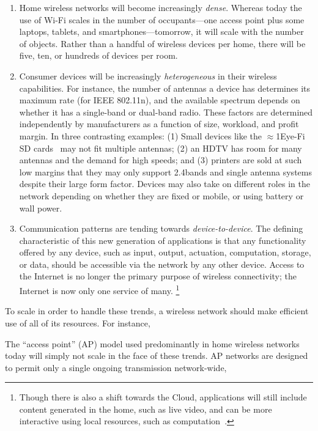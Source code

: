 \begin{enumerate}
\item Home wireless networks will become increasingly \emph{dense}. Whereas today the use of Wi-Fi scales in the number of occupants---one access point plus some laptops, tablets, and smartphones---tomorrow, it will scale with the number of objects. Rather than a handful of wireless devices per home, there will be five, ten, or hundreds of devices per room.
%
\item Consumer devices will be increasingly \emph{heterogeneous} in their wireless capabilities. For instance, the number of antennas a device has determines its maximum rate (for IEEE 802.11n), and the available spectrum depends on whether it has a single-band or dual-band radio. These factors are determined independently by manufacturers as a function of size, workload, and profit margin. In three contrasting examples: (1) Small devices like the $\approx$1\insq Eye-Fi SD cards~\cite{EyeFi} may not fit multiple antennas; (2) an HDTV has room for many antennas and the demand for high speeds; and (3) printers are sold at such low margins that they may only support 2.4\GHz bands and single antenna systems despite their large form factor. Devices may also take on different roles in the network depending on whether they are fixed or mobile, or using battery or wall power.
%
\item Communication patterns are tending towards \emph{device-to-device}. The defining characteristic of this new generation of applications is that any functionality offered by any device, such as input, output, actuation, computation, storage, or data, should be accessible via the network by any other device. Access to the Internet is no longer the primary purpose of wireless connectivity; the Internet is now only one service of many.%
\footnote{Though there is also a shift towards the Cloud, applications will still include content generated in the home, such as live video, and can be more interactive using local resources, such as computation~\cite{Satya_Cloudlets}.}
\end{enumerate}

To scale in order to handle these trends, a wireless network should make efficient use of all of its resources. For instance, 

The ``access point'' (AP) model used predominantly in home wireless networks today will simply not scale in the face of these trends. AP networks are designed to permit only a single ongoing transmission network-wide, 

\ifx\mainfile\undefined

\fi
